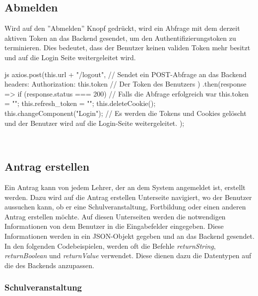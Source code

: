 \subsection{Abmelden}
Wird auf den ''Abmelden'' Knopf gedrückt, wird ein Abfrage mit dem derzeit aktiven Token an das Backend gesendet, um den Authentifizierungstoken zu terminieren. Dies bedeutet, dass der Benutzer keinen validen Token mehr besitzt und auf die Login Seite weitergeleitet wird.
\begin{code}{js}
axios.post(this.url + "/logout", {	// Sendet ein POST-Abfrage an das Backend
	headers: { Authorization: this.token }	// Der Token des Benutzers
})
.then(response => {
	if (response.status === 200) {	// Falls die Abfrage erfolgreich war
		this.token = "";
		this.refresh_token = "";
		this.deleteCookie();
		this.changeComponent("Login");	// Es werden die Tokens und Cookies gelöscht und der Benutzer wird auf die Login-Seite weitergeleitet.
	}
});
\end{code}
~\\
\newpage
\subsection{Antrag erstellen}
Ein Antrag kann von jedem Lehrer, der an dem System angemeldet ist, erstellt werden. Dazu wird auf die Antrag erstellen Unterseite navigiert, wo der Benutzer aussuchen kann, ob er eine Schulveranstaltung, Fortbildung oder einen anderen Antrag erstellen möchte. Auf diesen Unterseiten werden die notwendigen Informationen von dem Benutzer in die Eingabefelder eingegeben. Diese Informationen werden in ein JSON-Objekt gegeben und an das Backend gesendet.
\\
In den folgenden Codebeispielen, werden oft die Befehle \textit{returnString}, \textit{returnBoolean} und \textit{returnValue} verwendet. Diese dienen dazu die Datentypen auf die des Backends anzupassen. 
\subsubsection{Schulveranstaltung}
